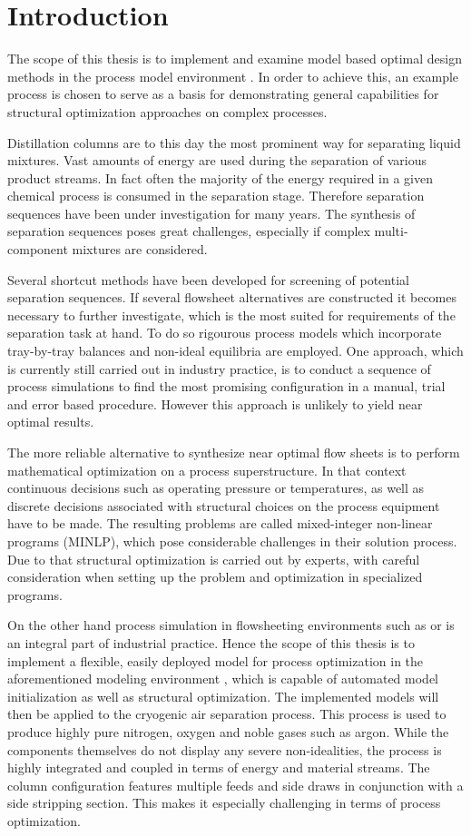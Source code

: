 \chapter{Introduction}
\label{chp:intro}
The scope of this thesis is to implement and examine model based optimal design methods in the process 
model environment \gproms. In order to achieve this, an example process is chosen to serve as a basis 
for demonstrating general capabilities for structural optimization approaches on complex processes. 

Distillation columns are to this day the most prominent way for separating liquid mixtures. Vast amounts of energy
are used during the separation of various product streams. In fact often the majority of the energy required in
a given chemical process is consumed in the separation stage. Therefore separation sequences have been under investigation
for many years. The synthesis of separation sequences poses great challenges, especially if complex
multi-component mixtures are considered.

Several shortcut methods have been developed for screening of potential separation sequences. If several
flowsheet alternatives are constructed it becomes necessary to further investigate, which is the most
suited for requirements of the separation task at hand. To do so rigourous process models which incorporate tray-by-tray balances and
non-ideal equilibria are employed. One approach, which is currently still carried out in industry practice,
is to conduct a sequence of process simulations to find the most promising configuration in a manual, trial
and error based procedure. However this approach is unlikely to yield near optimal results.

The more reliable alternative to synthesize near optimal flow sheets is to perform mathematical optimization
on a process superstructure. In that context continuous decisions such as operating pressure or temperatures,
as well as discrete decisions associated with structural choices on the process equipment have to be made. The
resulting problems are called mixed-integer non-linear programs (MINLP), which pose considerable challenges
in their solution process. Due to that structural optimization is carried out by experts, with careful consideration
when setting up the problem and optimization in specialized programs.

On the other hand process simulation in flowsheeting environments such as \aspen or \gproms is an integral
part of industrial practice. Hence the scope of this thesis is to implement a flexible, easily deployed
model for process optimization in the aforementioned modeling environment \gproms, which is capable of
automated model initialization as well as structural optimization.
The implemented models will then be applied to the cryogenic air separation process. This process is used to
produce highly pure nitrogen, oxygen and noble gases such as argon. While the components themselves
do not display any severe non-idealities, the process is highly integrated and coupled in terms of energy
and material streams. The column configuration features multiple feeds and side draws in conjunction with
a side stripping section. This makes it especially challenging in terms of process optimization.

